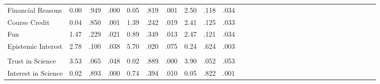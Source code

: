 \documentclass[authordate, empirical,issue]{jote-new-article}
\begin{document}
\begin{table}[t]
\begin{fullwidth}
\begin{tabular}{@{} l l l l l l l l l l l l l l l l l l l l l l l l l l l l l l @{}}
      Financial Reasons       & 0.00                                            & .949                                  & .000                & 0.05  & .819 & .001                & 2.50 & .118
                              & .034                                                                                                                                                                                   \\

      Course Credit           & 0.04                                            & .850                                  & .001                & 1.39  & .242 & .019                & 2.41 & .125 & .033
      \\

      Fun                     & 1.47                                            & .229                                  & .021                & 0.89  & .349 & .013                & 2.47 & .121 & .034                \\

      Epistemic Interest      & 2.78                                            & .100                                  & .038                & 5.70  & .020 & .075                & 0.24 & .624
                              & .003                                                                                                                                                                                   \\

                              &                                                 &                                       &                     &       &      &                     &      &      &                     \\

      Trust in Science        & 3.53                                            & .065                                  & .048                & 0.02  & .889 & .000                & 3.90 & .052 &
      .053                                                                                                                                                                                                             \\

      Interest in Science     & 0.02                                            & .893                                  & .000                & 0.74  & .394 & .010                & 0.05 & .822
                              & .001                                                                                                                                                                                   \\


\end{tabular}
\end{fullwidth}
\end{table}
\end{document}
